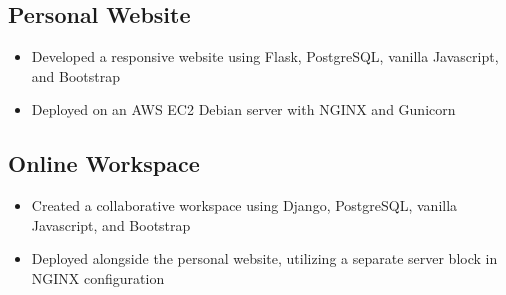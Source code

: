 \documentclass{article}
\begin{document}
\begin{paracol}{2}
  \color{BodyGrey}
  \subsection{Personal Website}
  \href{https://www.kunheeha.com}{\underline{}\hspace{5pt}{\color{LightGrey}\scriptsize\faExternalLink}}
  \begin{itemize}[leftmargin=*]
    \setlength\itemsep{-2pt}
    \item Developed a responsive website using Flask, PostgreSQL, vanilla Javascript, and Bootstrap
    \item Deployed on an AWS EC2 Debian server with NGINX and Gunicorn
  \end{itemize}

  \subsection{Online Workspace}
  \href{https://www.onlineworkspace.com}{\underline{}\hspace{5pt}{\color{LightGrey}\scriptsize\faExternalLink}}
  \begin{itemize}[leftmargin=*]
    \setlength\itemsep{-2pt}
    \item Created a collaborative workspace using Django, PostgreSQL, vanilla Javascript, and Bootstrap
    \item Deployed alongside the personal website, utilizing a separate server block in NGINX configuration
  \end{itemize}


%  

\end{paracol}
\end{document}
